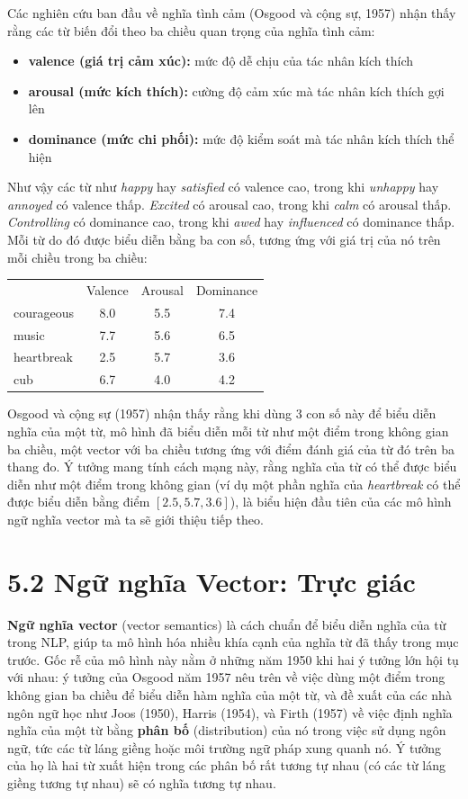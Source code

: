 Các nghiên cứu ban đầu về nghĩa tình cảm (Osgood và cộng sự, 1957) nhận thấy rằng các từ biến đổi theo ba chiều quan trọng của nghĩa tình cảm:

\begin{itemize}
  \item \textbf{valence (giá trị cảm xúc):} mức độ dễ chịu của tác nhân kích thích
  \item \textbf{arousal (mức kích thích):} cường độ cảm xúc mà tác nhân kích thích gợi lên
  \item \textbf{dominance (mức chi phối):} mức độ kiểm soát mà tác nhân kích thích thể hiện
\end{itemize}

Như vậy các từ như \emph{happy} hay \emph{satisfied} có valence cao, trong khi \emph{unhappy} hay \emph{annoyed} có valence thấp. \emph{Excited} có arousal cao, trong khi \emph{calm} có arousal thấp. \emph{Controlling} có dominance cao, trong khi \emph{awed} hay \emph{influenced} có dominance thấp. Mỗi từ do đó được biểu diễn bằng ba con số, tương ứng với giá trị của nó trên mỗi chiều trong ba chiều:

\begin{center}
\begin{tabular}{lccc}
 & Valence & Arousal & Dominance \\
courageous & 8.0 & 5.5 & 7.4 \\
music & 7.7 & 5.6 & 6.5 \\
heartbreak & 2.5 & 5.7 & 3.6 \\
cub & 6.7 & 4.0 & 4.2 \\
\end{tabular}
\end{center}

Osgood và cộng sự (1957) nhận thấy rằng khi dùng 3 con số này để biểu diễn nghĩa của một từ, mô hình đã biểu diễn mỗi từ như một điểm trong không gian ba chiều, một vector với ba chiều tương ứng với điểm đánh giá của từ đó trên ba thang đo. Ý tưởng mang tính cách mạng này, rằng nghĩa của từ có thể được biểu diễn như một điểm trong không gian (ví dụ một phần nghĩa của \emph{heartbreak} có thể được biểu diễn bằng điểm $[2.5, 5.7, 3.6]$), là biểu hiện đầu tiên của các mô hình ngữ nghĩa vector mà ta sẽ giới thiệu tiếp theo.

\section{5.2 Ngữ nghĩa Vector: Trực giác}

\textbf{Ngữ nghĩa vector} (vector semantics) là cách chuẩn để biểu diễn nghĩa của từ trong NLP, giúp ta mô hình hóa nhiều khía cạnh của nghĩa từ đã thấy trong mục trước. Gốc rễ của mô hình này nằm ở những năm 1950 khi hai ý tưởng lớn hội tụ với nhau: ý tưởng của Osgood năm 1957 nêu trên về việc dùng một điểm trong không gian ba chiều để biểu diễn hàm nghĩa của một từ, và đề xuất của các nhà ngôn ngữ học như Joos (1950), Harris (1954), và Firth (1957) về việc định nghĩa nghĩa của một từ bằng \textbf{phân bố} (distribution) của nó trong việc sử dụng ngôn ngữ, tức các từ láng giềng hoặc môi trường ngữ pháp xung quanh nó. Ý tưởng của họ là hai từ xuất hiện trong các phân bố rất tương tự nhau (có các từ láng giềng tương tự nhau) sẽ có nghĩa tương tự nhau.

